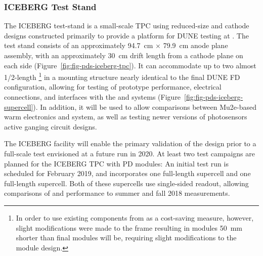 % 

\subsubsection{ICEBERG Test Stand}
\label{sec:iceberg-teststand}

The ICEBERG test-stand is a small-scale TPC using reduced-size   and cathode designs constructed primarily to provide a platform for DUNE  testing at . 
The test stand consists of an approximately \SI{94.7}{cm} $\times$ \SI{79.9}{cm} anode plane assembly, with an approximately \SI{30}{cm} drift length from a cathode plane on each side (Figure~\ref{fig:fig-pds-iceberg-tpc}).  
It can accommodate up to two almost 1/2-length \footnote{In order to use existing  components from  as a cost-saving measure, however, slight modifications were made to the  frame resulting in  modules \SI{50}{mm} shorter than final modules will be, requiring slight modifications to the  module design.} in a mounting structure nearly identical to the final DUNE FD configuration, allowing for testing of  prototype performance, electrical connections, and interfaces with the  and  systems (Figure~\ref{fig:fig-pds-iceberg-supercell}). 
In addition, it will be used to allow comparisons between Mu2e-based warm electronics and   system, as well as testing newer versions of photosensors active ganging circuit designs.


The ICEBERG facility will enable the primary validation of the  design prior to a full-scale test envisioned at a future  run in 2020. 
At least two test campaigns are planned for the ICEBERG TPC with PD modules:  An initial test run is scheduled for February 2019, and incorporates one full-length  supercell and one full-length  supercell.  Both of these supercells 
use single-sided readout, allowing comparisons of  and  performance to summer and fall 2018  measurements.

